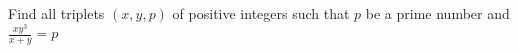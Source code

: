 Find all triplets $(x,y,p)$ of positive integers such that $p$ be a prime number and $\frac{xy^3}{x+y}=p$